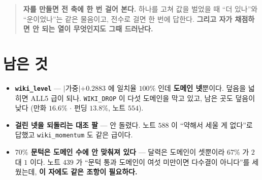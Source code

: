 \documentclass[11pt]{article}
\begin{document}
\begin{quote}
\textbf{자를 만들면 전 축에 한 번 걸어 본다.} 하나를 고쳐 값을 벌었을 때
``더 있나''와 ``운이었나''는 같은 물음이고, 전수로 걸면 한 번에 답한다.
\textbf{그리고 자가 채점하면 안 되는 열이 무엇인지도 그때 드러난다.}
\end{quote}

\section*{남은 것}

\begin{itemize}
\item \textbf{\texttt{wiki\_level}} --- $|$가중$| +0.2883$ 에 일치율
$100\%$ 인데 \textbf{도메인 넷}뿐이다. 덮음을 넓히면 ALL5 급이 되나.
\texttt{WIKI\_DROP} 이 다섯 도메인을 막고 있고, 남은 곳도 덮음이 낮다
(만화 $16.6\%$ $\cdot$ 펀딩 $13.8\%$, 노트 $554$).
\item \textbf{걸린 넷을 되돌리는 대조 팔} --- 안 돌렸다. 노트 $588$ 이
``약해서 세울 게 없다''로 답했고 \texttt{wiki\_momentum} 도 같은 급이다.
\item \textbf{$70\%$ 문턱은 도메인 수에 안 맞춰져 있다} --- 달력은 도메인이
셋뿐이라 $67\%$ 가 $2$ 대 $1$ 이다. 노트 $439$ 가 ``문턱 통과 도메인이
여섯 미만이면 다수결이 아니다''를 세웠는데, \textbf{이 자에도 같은 조항이
필요하다.}
\end{itemize}
\end{document}
